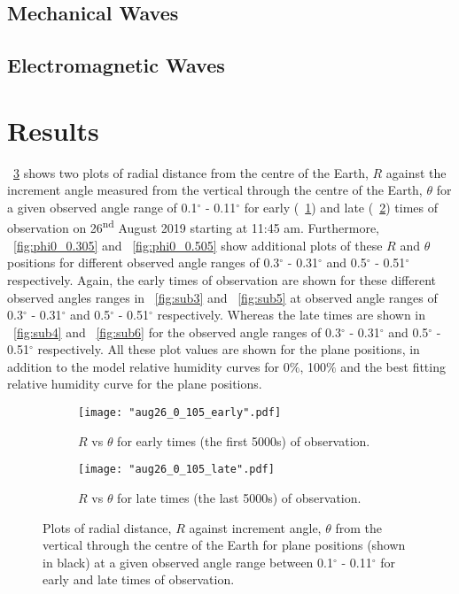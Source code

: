 \documentclass{article}
\newcommand{\figref}[2][\figurename~]{#1\ref{#2}}
\begin{document}
\subsection{Mechanical Waves}
\label{ssec:ripple-method}


\subsection{Electromagnetic Waves}
\label{ssec:diffraction-method}


\section{Results}


\figref{fig:phi0_0.105} shows two plots of radial distance from the centre of the Earth, $R$ against the increment angle measured from the vertical through the centre of the Earth, $\theta$ for a given observed angle range of 0.1$^{\circ}$ - 0.11$^{\circ}$ for early (\figref{fig:sub1}) and late (\figref{fig:sub2}) times of observation on 26\textsuperscript{nd} August 2019 starting at 11:45 am. Furthermore, \figref{fig:phi0_0.305} and \figref{fig:phi0_0.505} show additional plots of these $R$ and $\theta$ positions for different observed angle ranges of 0.3$^{\circ}$ - 0.31$^{\circ}$ and 0.5$^{\circ}$ - 0.51$^{\circ}$ respectively. Again, the early times of observation are shown for these different observed angles ranges in \figref{fig:sub3} and \figref{fig:sub5} at observed angle ranges of 0.3$^{\circ}$ - 0.31$^{\circ}$ and 0.5$^{\circ}$ - 0.51$^{\circ}$ respectively. Whereas the late times are shown in \figref{fig:sub4} and \figref{fig:sub6} for the observed angle ranges of 0.3$^{\circ}$ - 0.31$^{\circ}$ and 0.5$^{\circ}$ - 0.51$^{\circ}$ respectively. All these plot values are shown for the plane positions, in addition to the model relative humidity curves for 0$\%$, 100$\%$ and the best fitting relative humidity curve for the plane positions.

\begin{figure}
\centering
\begin{subfigure}{.5\textwidth}
  \centering
  \texttt{[image: "aug26\_0\_105\_early".pdf]}
  \caption{$R$ vs $\theta$ for early times (the first 5000s) of observation.}
  \label{fig:sub1}
\end{subfigure}%
\begin{subfigure}{.5\textwidth}
  \centering
  \texttt{[image: "aug26\_0\_105\_late".pdf]}
  \caption{$R$ vs $\theta$ for late times (the last 5000s) of observation.}
  \label{fig:sub2}
\end{subfigure}
\caption{Plots of radial distance, $R$ against increment angle, $\theta$ from the vertical through the centre of the Earth for plane positions (shown in black) at a given observed angle range between 0.1$^{\circ}$ - 0.11$^{\circ}$ for early and late times of observation.}
\label{fig:phi0_0.105}
\end{figure}
\end{document}
